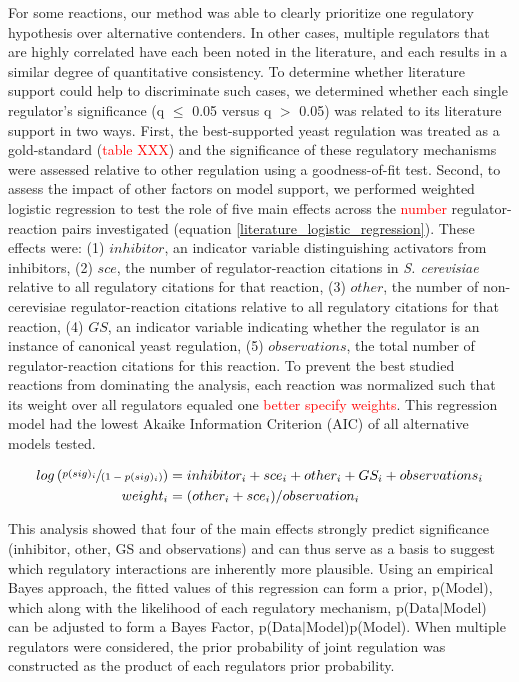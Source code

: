 For some reactions, our method was able to clearly prioritize one regulatory hypothesis over alternative contenders.  In other cases, multiple regulators that are highly correlated have each been noted in the literature, and each results in a similar degree of quantitative consistency.  To determine whether literature support could help to discriminate such cases, we determined whether each single regulator's significance (q $\le$ 0.05 versus q $>$ 0.05) was related to its literature support in two ways.  First, the best-supported yeast regulation was treated as a gold-standard (\textcolor{red}{table XXX}) and the significance of these regulatory mechanisms were assessed relative to other regulation using a goodness-of-fit test.  Second, to assess the impact of other factors on model support, we performed weighted logistic regression to test the role of five main effects across the \textcolor{red}{number} regulator-reaction pairs investigated (equation \ref{literature_logistic_regression}).  These effects were: (1) $inhibitor$, an indicator variable distinguishing activators from inhibitors, (2) $sce$, the number of regulator-reaction citations in \textit{S. cerevisiae} relative to all regulatory citations for that reaction, (3) $other$, the number of non-cerevisiae regulator-reaction citations relative to all regulatory citations for that reaction, (4) $GS$, an indicator variable indicating whether the regulator is an instance of canonical yeast regulation, (5) $observations$, the total number of regulator-reaction citations for this reaction.  To prevent the best studied reactions from dominating the analysis, each reaction was normalized such that its weight over all regulators equaled one \textcolor{red}{better specify weights}. This regression model had the lowest Akaike Information Criterion (AIC) of all alternative models tested.

\begin{align}
log\left(\sfrac{p(sig)_{i}}{(1-p(sig)_{i})}\right) &= inhibitor_{i} + sce_{i} + other_{i} + GS_{i} + observations_{i} \notag\\
weight_{i} &= (other_{i} + sce_{i})/observation_{i} \label{literature_logistic_regression}
\end{align}

This analysis showed that four of the main effects strongly predict significance (inhibitor, other, GS and observations) and can thus serve as a basis to suggest which regulatory interactions are inherently more plausible.  Using an empirical Bayes approach, the fitted values of this regression can form a prior, p(Model), which along with the likelihood of each regulatory mechanism, p(Data$|$Model) can be adjusted to  form a Bayes Factor, p(Data$|$Model)p(Model).  When multiple regulators were considered, the prior probability of joint regulation was constructed as the product of each regulators prior probability.

